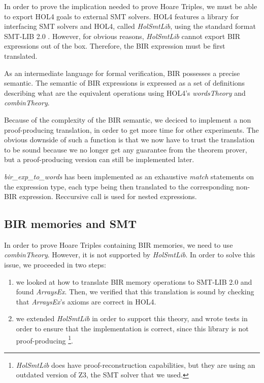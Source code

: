 \documentclass[10pt,a4paper]{article}
\begin{document}
\begin{multicols}{2}
In order to prove the implication needed to prove Hoare Triples, we must be able to export HOL4 goals to external SMT solvers. HOL4 features a library for interfacing {SMT} solvers and HOL4, called \textit{HolSmtLib}, using the standard format SMT-LIB 2.0 \cite{barrett_satisfiability_2016}. However, for obvious reasons, \textit{HolSmtLib} cannot export BIR expressions out of the box. Therefore, the BIR expression must be first translated.

As an intermediate language for formal verification, {BIR} possesses a precise semantic. The semantic of BIR expressions is expressed as a set of definitions describing what are the equivalent operations using HOL4's \textit{wordsTheory} and \textit{combinTheory}.

Because of the complexity of the BIR semantic, we deciced to implement a non proof-producing translation, in order to get more time for other experiments. The obvious downside of such a function is that we now have to trust the translation to be sound because we no longer get any guarantee from the theorem prover, but a proof-producing version can still be implemented later.

\textit{bir\_exp\_to\_words} has been implemented as an exhaustive \textit{match} statements on the expression type, each type being then translated to the corresponding non-BIR expression. Reccursive call is used for nested expressions.

\subsection{BIR memories and SMT} \label{bir-memories-with-smt-solvers}


In order to prove Hoare Triples containing BIR memories, we need to use \textit{combinTheory}. However, it is not supported by \textit{HolSmtLib}. In order to solve this issue, we proceeded in two steps:

\begin{enumerate}
  \item we looked at how to translate BIR memory operations to SMT-LIB 2.0 and found \textit{ArraysEx}. Then, we verified that this translation is sound by checking that \textit{ArraysEx}'s axioms are correct in HOL4.
  \item we extended \textit{HolSmtLib} in order to support this theory, and wrote tests in order to ensure that the implementation is correct, since this library is not proof-producing \footnote{\textit{HolSmtLib} does have proof-reconstruction capabilities, but they are using an outdated version of Z3, the SMT solver that we used.}.
\end{enumerate}


\end{multicols}
\end{document}
